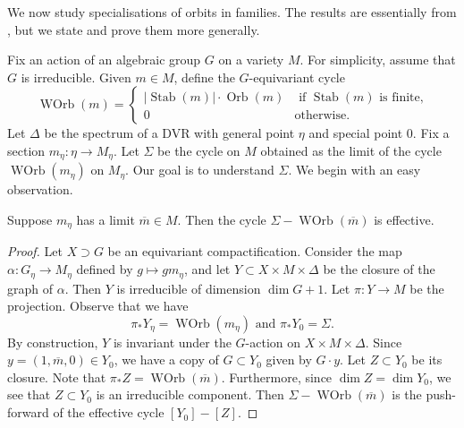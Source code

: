 \documentclass[11pt]{amsart}
\providecommand {\from}{{\colon}}
\DeclareMathOperator{\Orb}{Orb}
\DeclareMathOperator{\WOrb}{WOrb}
\DeclareMathOperator{\Stab}{Stab}
\begin{document}
We now study specialisations of orbits in families.
The results are essentially from \cite[\S~2.5]{lee.pat.tse:19}, but we state and prove them more generally.

Fix an action of an algebraic group \(G\) on a variety \(M\).
For simplicity, assume that \(G\) is irreducible.
Given \(m \in M\), define the \(G\)-equivariant cycle
\[
  \WOrb(m) = \begin{cases}
    |\Stab(m)| \cdot \Orb(m) & \text{ if \(\Stab(m)\) is finite,} \\
    0 & \text{otherwise}.
  \end{cases}
\]
Let \(\Delta\) be the spectrum of a DVR with general point \(\eta\) and special point \(0\).
Fix a section \(m_\eta \from \eta \to M_\eta\).
Let \(\Sigma\) be the cycle on \(M\) obtained as the limit of the cycle \(\WOrb(m_\eta)\) on \(M_\eta\).
Our goal is to understand \(\Sigma\).
We begin with an easy observation.

\begin{proposition}\label{prop:onelimit}
  Suppose \(m_\eta\) has a limit \(\overline m \in M\).
  Then the cycle \(\Sigma - \WOrb(\overline m)\) is effective.
\end{proposition}
\begin{proof}
  Let \(X \supset G\) be an equivariant compactification.
  Consider the map \(\alpha \colon G_\eta \to M_\eta\) defined by \(g \mapsto g m_\eta\), and let \(Y \subset X \times M \times \Delta\) be the closure of the graph of \(\alpha\).
  Then \(Y\) is irreducible of dimension \(\dim G + 1\).
  Let \(\pi \colon Y \to M\) be the projection.
  Observe that we have
  \[ {\pi}_* Y_\eta = \WOrb(m_\eta) \text{ and } {\pi}_* Y_0 = \Sigma.\]
  By construction, \(Y\) is invariant under the \(G\)-action on \(X \times M \times \Delta\).
  Since \(y = (1,\overline m, 0) \in Y_0\), we have a copy of \(G \subset Y_0\) given by \(G \cdot y\).
  Let \(Z \subset Y_0\) be its closure.
  Note that \({\pi}_* Z = \WOrb(\overline m)\).
  Furthermore, since \(\dim Z = \dim Y_0\), we see that \(Z \subset Y_0\) is an irreducible component.
  Then \(\Sigma - \WOrb(\overline m)\) is the push-forward of the effective cycle \([Y_0] - [Z]\).
\end{proof}
\end{document}
